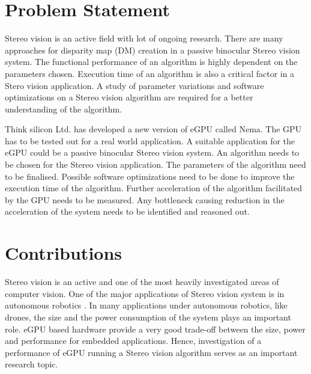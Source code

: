 \section{Problem Statement}
\label{sec:intro:probstatement}

Stereo vision is an active field with lot of ongoing research. There are many approaches for disparity map (DM) creation in a passive binocular Stereo vision system. The functional performance of an algorithm is highly dependent on the parameters chosen. Execution time of an algorithm is also a critical factor in a Stero vision application. A study of parameter variations and software optimizations on a Stereo vision algorithm are required for a better understanding of the algorithm. 

Think silicon Ltd. has developed a new version of eGPU called Nema. The GPU has to be tested out for a real world application. A suitable application for the eGPU could be a passive binocular Stereo vision system. An algorithm needs to be chosen for the Stereo vision application. The parameters of the algorithm need to be finalised. Possible software optimizations need to be done to improve the execution time of the algorithm. Further acceleration of the algorithm facilitated by the GPU needs to be measured. Any bottleneck causing reduction in the acceleration of the system needs to be identified and reasoned out.


\section{Contributions}
\label{sec:intro:contrib}

Stereo vision is an active and one of the most heavily investigated areas of computer vision. One of the major applications of Stereo vision system is in autonomous robotics \cite{pinhas_ben-tzvi_embedded_2010}. In many applications under autonomous robotics, like drones, the size and the power consumption of the system plays an important role. eGPU based hardware provide a very good trade-off between the size, power and performance for embedded applications. Hence, investigation of a performance of eGPU running a Stereo vision algorithm serves as an important research topic.
%

